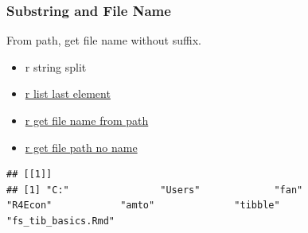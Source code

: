 \documentclass[
]{book}
\newenvironment{Shaded}{\begin{snugshade}}{\end{snugshade}}
\newcommand{\CharTok}[1]{\textcolor[rgb]{0.31,0.60,0.02}{#1}}
\newcommand{\DataTypeTok}[1]{\textcolor[rgb]{0.13,0.29,0.53}{#1}}
\newcommand{\DecValTok}[1]{\textcolor[rgb]{0.00,0.00,0.81}{#1}}
\newcommand{\KeywordTok}[1]{\textcolor[rgb]{0.13,0.29,0.53}{\textbf{#1}}}
\newcommand{\NormalTok}[1]{#1}
\newcommand{\OperatorTok}[1]{\textcolor[rgb]{0.81,0.36,0.00}{\textbf{#1}}}
\newcommand{\StringTok}[1]{\textcolor[rgb]{0.31,0.60,0.02}{#1}}
\providecommand{\tightlist}{%
  \setlength{\itemsep}{0pt}\setlength{\parskip}{0pt}}
\begin{document}
\hypertarget{substring-and-file-name}{%
\subsubsection{Substring and File Name}\label{substring-and-file-name}}

From path, get file name without suffix.

\begin{itemize}
\tightlist
\item
  r string split
\item
  \href{https://stackoverflow.com/a/83222/8280804}{r list last element}
\item
  \href{https://stackoverflow.com/a/29114007/8280804}{r get file name from path}
\item
  \href{https://stackoverflow.com/a/47189541/8280804}{r get file path no name}
\end{itemize}

\begin{Shaded}
\end{Shaded}

\begin{verbatim}
## [[1]]
## [1] "C:"                "Users"             "fan"               "R4Econ"            "amto"              "tibble"            "fs_tib_basics.Rmd"
\end{verbatim}
\end{document}
